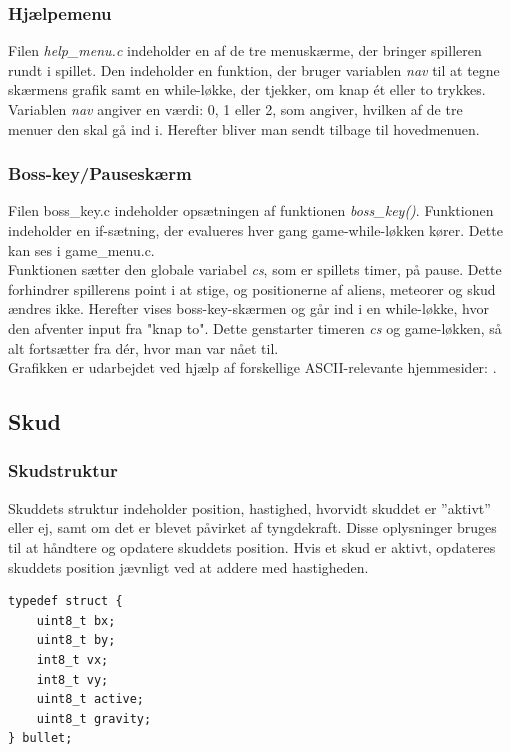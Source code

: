 \subsubsection{Hjælpemenu}
Filen \textit{help\_menu.c} indeholder en af de tre menuskærme, der bringer spilleren rundt i spillet. Den indeholder en funktion, der bruger variablen \textit{nav} til at tegne skærmens grafik samt en while-løkke, der tjekker, om knap ét eller to trykkes.\\
Variablen \textit{nav} angiver en værdi: 0, 1 eller 2, som angiver, hvilken af de tre menuer den skal gå ind i. Herefter bliver man sendt tilbage til hovedmenuen.

\subsubsection{Boss-key/Pauseskærm}
Filen boss\_key.c indeholder opsætningen af funktionen \textit{boss\_key()}. Funktionen indeholder en if-sætning, der evalueres hver gang game-while-løkken kører. Dette kan ses i game\_menu.c.\\
Funktionen sætter den globale variabel \textit{cs}, som er spillets timer, på pause. Dette forhindrer spillerens point i at stige, og positionerne af aliens, meteorer og skud ændres ikke. Herefter vises boss-key-skærmen og går ind i en while-løkke, hvor den afventer input fra "knap to". Dette genstarter timeren \textit{cs} og game-løkken, så alt fortsætter fra dér, hvor man var nået til.\\
Grafikken er udarbejdet ved hjælp af forskellige ASCII-relevante hjemmesider: \cite{Text_to_ASCII_converter} \cite{ASCII_art}.


\subsection{Skud}
\subsubsection{Skudstruktur}
Skuddets struktur indeholder position, hastighed, hvorvidt skuddet er ”aktivt” eller ej, samt om det er blevet påvirket af tyngdekraft. Disse oplysninger bruges til at håndtere og opdatere skuddets position. Hvis et skud er aktivt, opdateres skuddets position jævnligt ved at addere med hastigheden.
\begin{lstlisting}[caption={Skudarray kode}] 
typedef struct {
    uint8_t bx;
    uint8_t by;
    int8_t vx;
    int8_t vy;
    uint8_t active;
    uint8_t gravity;
} bullet;
\end{lstlisting}

